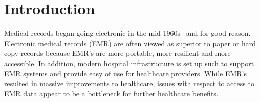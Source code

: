 \section{Introduction} \label{sec:intro}

\iffalse
Outline and Notes

Medical records went electronic for a reason
	- portability
	- resilience
	- accessibility
	- etc...
accessible for who?
	- only appears to help care providers and admin within a hospital within
	  a specific EMR domain
	- if we imagine an information chain, patient access is limited
	- researcher access is limited
Biomedical field is in the big data era thanks to EMR
	- big data affords many tools such as machine and deep learning 
	- EMR inconsistencies is a problem
		- this is why data curration exists
		- different systems
		- talk about the contrast of using HL7 in the back end of most
		  systems but output is different for each system
Acquiring clean and good quality medical data is important w.r.t medical and
healthcare advancement

\fi

Medical records began going electronic in the mid 1960s~\cite{TODO} and for
good reason.  Electronic medical records (EMR) are often viewed as superior to
paper or hard copy records because EMR's are more portable, more resilient and
more accessible.  In addition, modern hospital infrastructure is set up such to support
EMR systems and provide easy of use for healthcare providers.  While EMR's
resulted in massive improvements to healthcare, issues with respect to access
to EMR data appear to be a bottleneck for further healthcare benefits.  

